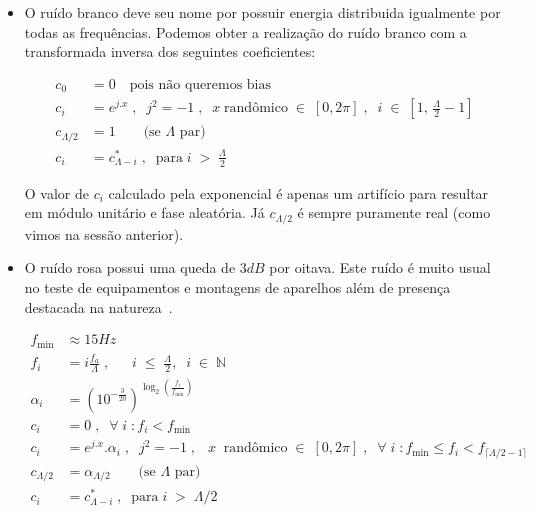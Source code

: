\begin{itemize}

\item O ruído branco deve seu nome por possuir energia distribuida
igualmente por todas as frequências. Podemos obter a realização
do ruído branco com a transformada inversa dos seguintes coeficientes:


\begin{equation}\label{eq:branco}
\begin{split}
c_0 & =0 \quad \text{pois não queremos bias} \\
c_i & =e^{j.x}\;,\;\; j^2=-1 \;, \;\; x \; \text{randômico} \; \in \; [0,2\pi]\;,\;\; i \; \in \; \left[1, \, \frac{\Lambda}{2}-1\right] \\
c_{\Lambda/2} & = 1 \quad\quad \text{(se $\Lambda$ par)}\\ 
c_i & = c_{\Lambda - i}^*\;,\;\; \text{para}\;  i \; > \;  \frac{\Lambda}{2}
\end{split}
\end{equation}

O valor de $c_i$ calculado pela exponencial é apenas um artifício para resultar em módulo unitário e fase aleatória.
Já $c_{\Lambda/2}$ é sempre puramente real (como vimos na sessão anterior).

\item O ruído rosa possui uma queda de $3dB$ por oitava. Este ruído é muito usual no teste de equipamentos e montagens de aparelhos além de presença destacada na natureza~\cite{Roederer}. 

\begin{equation}\label{eq:rosa}
\begin{split}
f_{\text{min}} & \approx 15 Hz \\
f_i & = i \frac{f_a}{\Lambda} \;, \;\; \quad i \;\leq\; \frac{\Lambda}{2},\;\; i\;\in\;\mathbb{N}  \\
\alpha_i & = (10^{-\frac{3}{20}})^{\log _2 \left ( \frac{f_i}{f_{\text{min}}} \right )}  \\
c_i & =0\;,\;\; \forall \; i \; : f_i<f_{\text{min}} \\
c_i & =e^{j.x} . \alpha_i\;,\;\; j^2=-1 \;, \;\;\  x \;\; \text{randômico} \; \in \; [0,2\pi]\;,\;\; \forall \; i \; : f_{\text{min}} \le f_i < f_{\lceil \Lambda/2-1 \rceil}  \\
c_{\Lambda/2} & = \alpha_{\Lambda/2} \quad\quad \text{(se $\Lambda$ par)}\\ 
c_i & = c_{\Lambda - i}^*\;,\;\; \text{para}\;  i \; > \;  \Lambda/2
\end{split}
\end{equation}


\end{itemize}
